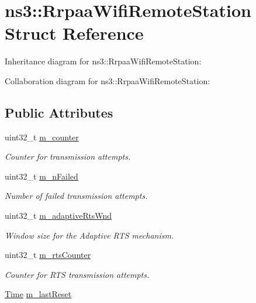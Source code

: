\hypertarget{structns3_1_1RrpaaWifiRemoteStation}{}\section{ns3\+:\+:Rrpaa\+Wifi\+Remote\+Station Struct Reference}
\label{structns3_1_1RrpaaWifiRemoteStation}


Inheritance diagram for ns3\+:\+:Rrpaa\+Wifi\+Remote\+Station\+:


Collaboration diagram for ns3\+:\+:Rrpaa\+Wifi\+Remote\+Station\+:
\subsection*{Public Attributes}
\begin{DoxyCompactItemize}
\item 
uint32\+\_\+t \hyperlink{structns3_1_1RrpaaWifiRemoteStation_a286b2167b4aa5b50156cb430bf6f7fe8}{m\+\_\+counter}
\begin{DoxyCompactList}\small\item\em Counter for transmission attempts. \end{DoxyCompactList}\item 
uint32\+\_\+t \hyperlink{structns3_1_1RrpaaWifiRemoteStation_a52227d8a1993fc867118cd2728ac2cd2}{m\+\_\+n\+Failed}
\begin{DoxyCompactList}\small\item\em Number of failed transmission attempts. \end{DoxyCompactList}\item 
uint32\+\_\+t \hyperlink{structns3_1_1RrpaaWifiRemoteStation_ae7565892bf6ab87348e2247c744254be}{m\+\_\+adaptive\+Rts\+Wnd}
\begin{DoxyCompactList}\small\item\em Window size for the Adaptive R\+TS mechanism. \end{DoxyCompactList}\item 
uint32\+\_\+t \hyperlink{structns3_1_1RrpaaWifiRemoteStation_a065e37b45777c7d651e4836fa172dcdb}{m\+\_\+rts\+Counter}
\begin{DoxyCompactList}\small\item\em Counter for R\+TS transmission attempts. \end{DoxyCompactList}\item 
\hyperlink{classns3_1_1Time}{Time} \hyperlink{structns3_1_1RrpaaWifiRemoteStation_aa90b3541302d0aacf06c97cee380f2d7}{m\+\_\+last\+Reset}

\end{DoxyCompactItemize}

